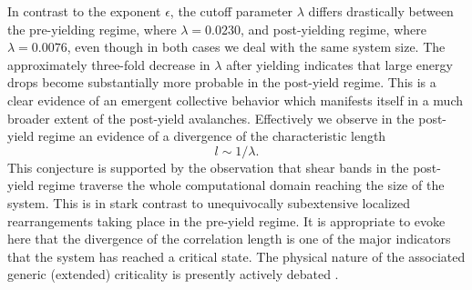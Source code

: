 \documentclass[aps,
superscriptaddress,notitlepage]{revtex4-1}
\begin{document}
%
%

%

In contrast to the exponent $\epsilon$,   the cutoff parameter $\lambda$ differs drastically  between the pre-yielding regime, where   $\lambda = 0.0230$,  and  post-yielding regime, where  $\lambda = 0.0076$, even though in both cases we deal with the same system size. The approximately three-fold decrease in $\lambda$ after yielding indicates that large energy drops become substantially more probable in the post-yield regime.  This is a clear   evidence  of  an emergent collective behavior which manifests itself in  a much broader extent of the post-yield  avalanches.  Effectively  we observe   in the post- yield regime  an evidence of a  divergence of the characteristic   length   
 \begin{equation}
l \sim 1/\lambda.
 \end{equation}
This conjecture is supported  by the observation  that  shear bands  in the post-yield regime   traverse the whole computational domain  reaching  the size of the system. This is in stark  contrast to unequivocally subextensive localized rearrangements   taking  place in the pre-yield regime. It is appropriate to evoke  here that the  divergence of the  correlation  length is one of the major indicators that the system  has  reached  a critical state.  The physical nature of the associated generic (extended) criticality  is presently actively  debated \cite{Grinstein1995-lw,Zippelius2023-ak,Charbonneau2023-oo,Oyama2023-oj,Xing2024-tz}.
\end{document}
